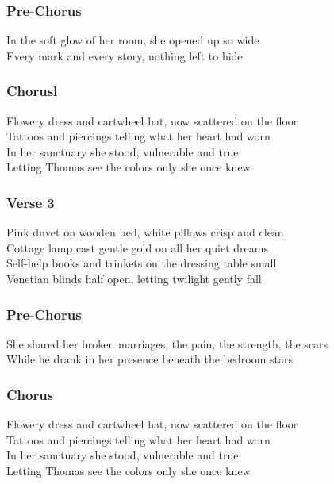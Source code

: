 \documentclass[]{article}
\begin{document}
\subsubsection{Pre-Chorus}\label{pre-chorus-50}

In the soft glow of her room, she opened up so wide\\
Every mark and every story, nothing left to hide

\subsubsection{Chorusl}\label{chorusl}

Flowery dress and cartwheel hat, now scattered on the floor\\
Tattoos and piercings telling what her heart had worn\\
In her sanctuary she stood, vulnerable and true\\
Letting Thomas see the colors only she once knew

\subsubsection{Verse 3}\label{verse-3-14}

Pink duvet on wooden bed, white pillows crisp and clean\\
Cottage lamp cast gentle gold on all her quiet dreams\\
Self-help books and trinkets on the dressing table small\\
Venetian blinds half open, letting twilight gently fall

\subsubsection{Pre-Chorus}\label{pre-chorus-51}

She shared her broken marriages, the pain, the strength, the scars\\
While he drank in her presence beneath the bedroom stars

\subsubsection{Chorus}\label{chorus-80}

Flowery dress and cartwheel hat, now scattered on the floor\\
Tattoos and piercings telling what her heart had worn\\
In her sanctuary she stood, vulnerable and true\\
Letting Thomas see the colors only she once knew
\end{document}
